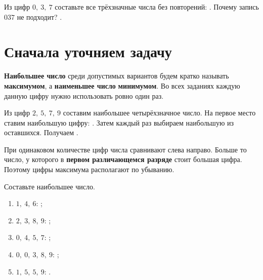 \studentnameblock



\begin{checkpointbox}
  Из цифр \(0,\ 3,\ 7\) составьте все трёхзначные числа без повторений:
  \answerblank[82mm]. Почему запись \(037\) не подходит?
  \answerblank[62mm].
\end{checkpointbox}



\section{Сначала уточняем задачу}

\begin{notebox}
  \textbf{Наибольшее число} среди допустимых вариантов будем кратко называть
  \textbf{максимумом}, а \textbf{наименьшее число} \textemdash{} \textbf{минимумом}.
  Во всех заданиях каждую данную цифру нужно использовать ровно один раз.
\end{notebox}

\begin{fillbox}
  Из цифр \(2,\ 5,\ 7,\ 9\) составим наибольшее четырёхзначное число.
  На первое место ставим наибольшую цифру: \answerblank[12mm]. Затем каждый
  раз выбираем наибольшую из оставшихся. Получаем \answerblank[38mm].
\end{fillbox}

\begin{reflectionbox}
  При одинаковом количестве цифр числа сравнивают слева направо. Больше то
  число, у которого в \textbf{первом различающемся разряде} стоит большая
  цифра. Поэтому цифры максимума располагают по убыванию.
\end{reflectionbox}

\begin{practicebox}
  Составьте наибольшее число.
  \begin{enumerate}[label=\textbf{\arabic*.}]
    \item \(1,\ 4,\ 6\): \answerblank[34mm];
    \item \(2,\ 3,\ 8,\ 9\): \answerblank[34mm];
    \item \(0,\ 4,\ 5,\ 7\): \answerblank[34mm];
    \item \(0,\ 0,\ 3,\ 8,\ 9\): \answerblank[38mm];
    \item \(1,\ 5,\ 5,\ 9\): \answerblank[34mm].
  \end{enumerate}
\end{practicebox}

